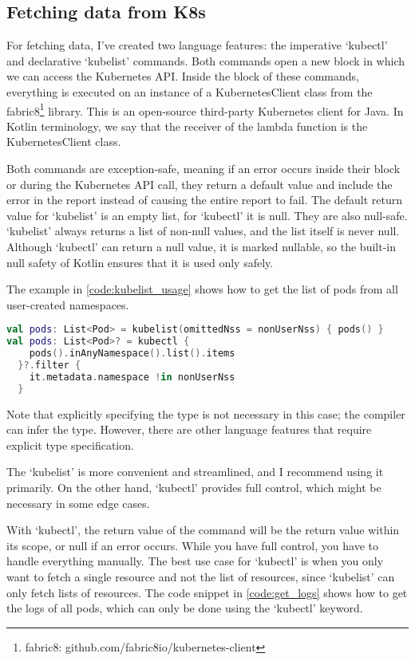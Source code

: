\subsection{Fetching data from K8s}

For fetching data, I've created two language features: the imperative `kubectl' and declarative `kubelist' commands. Both commands open a new block in which we can access the Kubernetes API. Inside the block of these commands, everything is executed on an instance of a KubernetesClient class from the fabric8\footnote{fabric8: github.com/fabric8io/kubernetes-client} library. This is an open-source third-party Kubernetes client for Java. In Kotlin terminology, we say that the receiver of the lambda function is the KubernetesClient class.

Both commands are exception-safe, meaning if an error occurs inside their block or during the Kubernetes API call, they return a default value and include the error in the report instead of causing the entire report to fail. The default return value for `kubelist' is an empty list, for `kubectl' it is null. They are also null-safe. `kubelist' always returns a list of non-null values, and the list itself is never null. Although `kubectl' can return a null value, it is marked nullable, so the built-in null safety of Kotlin ensures that it is used only safely.

The example in \ref{code:kubelist_usage} shows how to get the list of pods from all user-created namespaces.

\begin{lstlisting}[caption={Usage of kubelist and kubectl},language=Kotlin,label=code:kubelist_usage]
val pods: List<Pod> = kubelist(omittedNss = nonUserNss) { pods() }
val pods: List<Pod>? = kubectl { 
    pods().inAnyNamespace().list().items 
  }?.filter { 
    it.metadata.namespace !in nonUserNss 
  }
\end{lstlisting}

Note that explicitly specifying the type is not necessary in this case; the compiler can infer the type. However, there are other language features that require explicit type specification.

The `kubelist' is more convenient and streamlined, and I recommend using it primarily. On the other hand, `kubectl' provides full control, which might be necessary in some edge cases.

With `kubectl', the return value of the command will be the return value within its scope, or null if an error occurs. While you have full control, you have to handle everything manually. The best use case for `kubectl' is when you only want to fetch a single resource and not the list of resources, since `kubelist' can only fetch lists of resources. The code snippet in \ref{code:get_logs} shows how to get the logs of all pods, which can only be done using the `kubectl' keyword.

